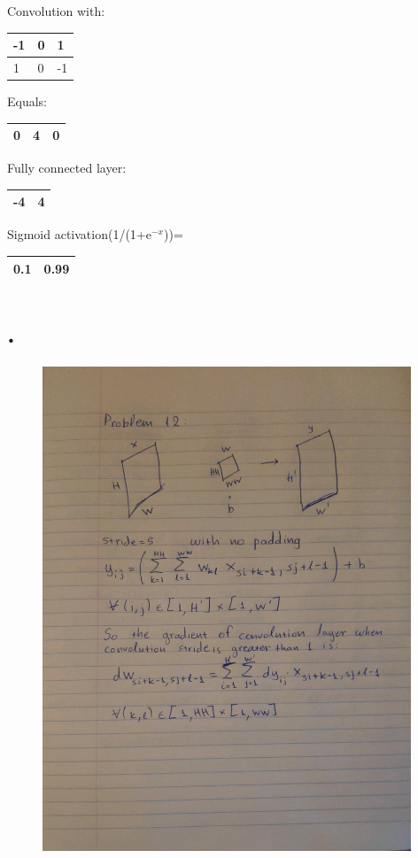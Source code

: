 \documentclass{article}
\begin{document}
 

 Convolution with:

\begin{tabular}{|p{0.4in}|p{0.4in}|p{0.4in}|} \hline 
-1 & 0 & 1 \\ \hline 
1 & 0 & -1 \\ \hline 
\end{tabular}



 Equals:  

\begin{tabular}{|p{0.5in}|p{0.5in}|p{0.5in}|} \hline 
0 & 4 & 0 \\ \hline 
\end{tabular}

 

 

 Fully connected layer:

\begin{tabular}{|p{0.4in}|p{0.4in}|} \hline 
-4 & 4 \\ \hline 
\end{tabular}

 Sigmoid activation(1/(1+e${}^{-x}$))=

\begin{tabular}{|p{0.4in}|p{0.4in}|} \hline 
0.1 & 0.99 \\ \hline 
\end{tabular}
\section{.}
\begin{figure}[htp]
    \centering
    \includegraphics[width=11cm]{photos/12.jpg}
    \label{fig:2}
\end{figure}
\newpage
\end{document}

